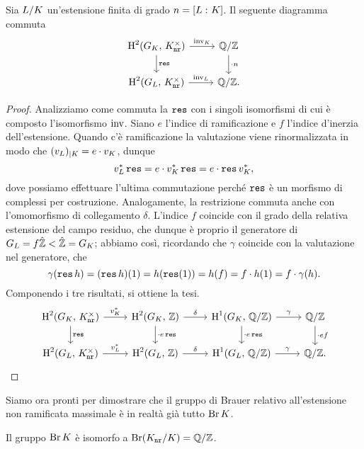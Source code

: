 \begin{proposition}\label{inv}
	Sia $ L/K $ un'estensione finita di grado $ n = [L\, \colon K] $. Il seguente diagramma commuta
	\[ \begin{tikzcd}
	\HH^2(G_\K, \, \knr^\times) \rar["\inv_\K"] \dar["\Res"]
	& \Q/\Z \dar["\cdot n"] \\
	\HH^2(G_L, \, \knr^\times) \rar["\inv_L"]
	& \Q/\Z.
	\end{tikzcd} \]
\end{proposition}
\begin{proof}
	Analizziamo come commuta la $ \operatorname{\mathtt{res}} $ con i singoli isomorfismi di cui è composto l'isomorfismo $ \operatorname{inv} $. Siano $ e $ l'indice di ramificazione e $ f $ l'indice d'inerzia dell'estensione. Quando c'è ramificazione la valutazione viene rinormalizzata in modo che $ (v_L)_{\mid K} = e \cdot v_K $, dunque
	\[ v_L^* \operatorname{\mathtt{res}} = e \cdot v_K^* \operatorname{\mathtt{res}}  = e \cdot  \operatorname{\mathtt{res}} v_K^*, \]
	dove possiamo effettuare l'ultima commutazione perché $ \operatorname{\mathtt{res}} $ è un morfismo di complessi per costruzione. 
	Analogamente, la restrizione commuta anche con l'omomorfismo di collegamento $ \delta $. L'indice $ f $ coincide con il grado della relativa estensione del campo residuo, che dunque è proprio il generatore di $ G_L = f\hat{\mathbb{Z}} < \hat{\mathbb{Z}} = G_K $; abbiamo così, ricordando che $ \gamma $ coincide con la valutazione nel generatore, che
	$$  \gamma(\operatorname{\mathtt{res}} h) = (\operatorname{\mathtt{res}} h)(1) = h(\operatorname{\mathtt{res}}(1)) = h(f) = f\cdot h(1) = f \cdot  \gamma(h).  $$
	Componendo i tre risultati, si ottiene la tesi.
	\[ \begin{tikzcd}
	\HH^2(G_\K, \, \knr^\times) \rar["v_\K^*"] \dar["\Res"]
	& \HH^2(G_\K, \, \Z) \dar["\cdot e\Res"] \rar["\delta"]
	& \HH^1(G_\K, \, \Q/\Z) \rar["\gamma"] \dar["\cdot e\Res"]
	& \Q/\Z \dar["\cdot ef"] \\
	\HH^2(G_L, \, \knr^\times) \rar["v_L^*"]
	& \HH^2(G_L, \, \Z) \rar["\delta"]
	& \HH^1(G_L, \, \Q/\Z) \rar["\gamma"]
	& \Q/\Z.
	\end{tikzcd} \]
\end{proof}

Siamo ora pronti per dimostrare che il gruppo di Brauer relativo all'estensione non ramificata massimale è in realtà già tutto $ \operatorname{Br} K $.

\begin{theorem}
	Il gruppo $ \operatorname{Br} K $ è isomorfo a $ \operatorname{Br} (K_\mathtt{nr}/K) = \mathbb{Q}/\mathbb{Z} $.
\end{theorem}

